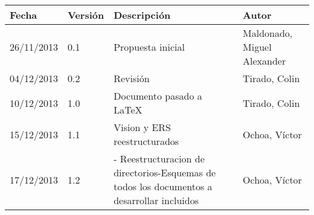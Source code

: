 \begin{tabular}{|p{3cm}|p{1.5cm}|p{3.5cm}|p{4cm}|}
    \hline
    \textbf{Fecha} & \textbf{Versión} & \textbf{Descripción} & \textbf{Autor} \\
    \hline
    26/11/2013 & 0.1 & Propuesta inicial & Maldonado, Miguel Alexander \\
    \hline
    04/12/2013 & 0.2 & Revisión & Tirado, Colin \\
    \hline
    10/12/2013 & 1.0 & Documento pasado a LaTeX & Tirado, Colin \\
    \hline
    15/12/2013 & 1.1 & Vision y ERS reestructurados & Ochoa, Víctor \\
    \hline
    17/12/2013 & 1.2 & - Reestructuracion de directorios\newline -Esquemas de todos los documentos a desarrollar incluidos & Ochoa, Víctor \\
    \hline
\end{tabular}
